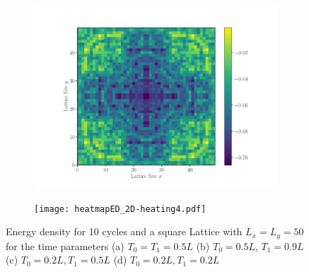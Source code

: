 \documentclass[11pt, a4paper, oneside]{book}
\theoremstyle{definition} %
\begin{document}
\begin{figure}[h]
\begin{subfigure}{.5\textwidth}
  \centering
  \includegraphics[width=\linewidth]{heatmapED_2D-heating3.pdf}
  \caption{}
\end{subfigure}
\begin{subfigure}{.5\textwidth}
  \centering
  \texttt{[image: heatmapED\_2D-heating4.pdf]}  
  \caption{}
\end{subfigure}
\caption{Energy density for 10 cycles and a square Lattice with $L_x = L_y = 50$ for the time parameters (a) $T_0 = T_1 = 0.5L$ (b) $T_0 = 0.5L$, $T_1 = 0.9L$ (c) $T_0 = 0.2L, T_1 = 0.5L$ (d) $T_0 = 0.2L, T_1 = 0.2L$}
\label{eq:Energy_density_heating2d}
\end{figure}
\end{document}
